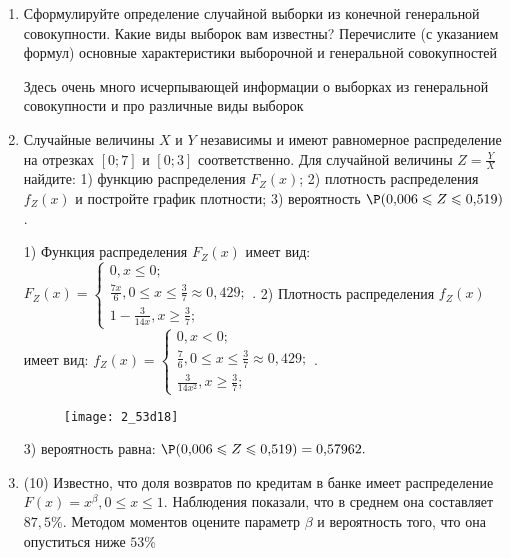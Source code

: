 \documentclass[a4paper,12pt]{article}
\begin{document}
\begin{enumerate}


\item


Сформулируйте определение случайной выборки из конечной генеральной совокупности. Какие
виды выборок вам известны? Перечислите (с указанием формул) основные характеристики выборочной и генеральной совокупностей




Здесь очень много исчерпывающей информации о выборках из генеральной совокупности и про различные виды выборок


\item



Случайные величины $X$ и $Y$ независимы и имеют равномерное
распределение на отрезках $[0;7]$ и $[0;3]$ соответственно. Для случайной величины $Z=\frac{Y}{X}$ найдите: 
1) функцию распределения $F_Z(x)$;
2) плотность распределения $f_Z(x)$ и постройте график плотности;
3) вероятность $\P(0,\!006\leqslant Z\leqslant 0,\!519)$.




1) Функция распределения $F_Z(x)$ имеет вид:
$
F_Z(x)=\left\{
\begin{array}{l}
0, x\leqslant 0;\\
\frac{7 x}{6}, 0\leqslant x\leqslant \frac{3}{7}\approx 0,\!429;\\
1 - \frac{3}{14 x}, x\geqslant\frac{3}{7};
\end{array}.
\right.
$
2) Плотность распределения $f_Z(x)$ имеет вид:
$
f_Z(x)=\left\{
\begin{array}{l}
0, x<0;\\
\frac{7}{6}, 0\leqslant x\leqslant \frac{3}{7}\approx 0,\!429;\\
\frac{3}{14 x^{2}}, x\geqslant\frac{3}{7};
\end{array}.
\right.
$


\begin{figure}[H]
    \texttt{[image: 2\_53d18]}
\end{figure}


3) вероятность равна:
$
\P(0,\!006\leqslant Z\leqslant 0,\!519)=
0,\!57962.
$


\item


(10) Известно, что доля возвратов по кредитам в банке имеет распределение $F(x) = x ^{\beta}, 0 \leqslant x \leqslant 1$.
Наблюдения показали, что в среднем она составляет $87,5\%$. Методом моментов оцените параметр $\beta$ и
вероятность того, что она опуститься ниже $53\%$





\end{enumerate}
\end{document}
